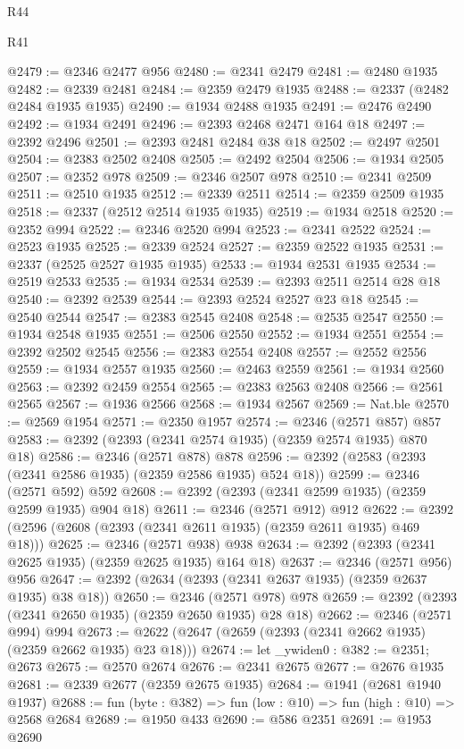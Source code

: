 \begin{lexlean}{R44}
\begin{lexlean}{R41}
\begin{coremodule}
{{{{{{{{{{{{{{{{{{{{{{{{{{{{{{{{{{{{{{{{{{{{{{{{{{{{{{{{{{{{{{{{{{{{{{{{{{{{{{{{{{{{{{{@2479 := @2346 @2477 @956
@2480 := @2341 @2479
@2481 := @2480 @1935
@2482 := @2339 @2481
@2484 := @2359 @2479 @1935
@2488 := @2337 (@2482 @2484 @1935 @1935)
@2490 := @1934 @2488 @1935
@2491 := @2476 @2490
@2492 := @1934 @2491
@2496 := @2393 @2468 @2471 @164 @18
@2497 := @2392 @2496
@2501 := @2393 @2481 @2484 @38 @18
@2502 := @2497 @2501
@2504 := @2383 @2502 @2408
@2505 := @2492 @2504
@2506 := @1934 @2505
@2507 := @2352 @978
@2509 := @2346 @2507 @978
@2510 := @2341 @2509
@2511 := @2510 @1935
@2512 := @2339 @2511
@2514 := @2359 @2509 @1935
@2518 := @2337 (@2512 @2514 @1935 @1935)
@2519 := @1934 @2518
@2520 := @2352 @994
@2522 := @2346 @2520 @994
@2523 := @2341 @2522
@2524 := @2523 @1935
@2525 := @2339 @2524
@2527 := @2359 @2522 @1935
@2531 := @2337 (@2525 @2527 @1935 @1935)
@2533 := @1934 @2531 @1935
@2534 := @2519 @2533
@2535 := @1934 @2534
@2539 := @2393 @2511 @2514 @28 @18
@2540 := @2392 @2539
@2544 := @2393 @2524 @2527 @23 @18
@2545 := @2540 @2544
@2547 := @2383 @2545 @2408
@2548 := @2535 @2547
@2550 := @1934 @2548 @1935
@2551 := @2506 @2550
@2552 := @1934 @2551
@2554 := @2392 @2502 @2545
@2556 := @2383 @2554 @2408
@2557 := @2552 @2556
@2559 := @1934 @2557 @1935
@2560 := @2463 @2559
@2561 := @1934 @2560
@2563 := @2392 @2459 @2554
@2565 := @2383 @2563 @2408
@2566 := @2561 @2565
@2567 := @1936 @2566
@2568 := @1934 @2567
@2569 := Nat.ble
@2570 := @2569 @1954
@2571 := @2350 @1957
@2574 := @2346 (@2571 @857) @857
@2583 := @2392 (@2393 (@2341 @2574 @1935) (@2359 @2574 @1935) @870 @18)
@2586 := @2346 (@2571 @878) @878
@2596 := @2392 (@2583 (@2393 (@2341 @2586 @1935) (@2359 @2586 @1935) @524 @18))
@2599 := @2346 (@2571 @592) @592
@2608 := @2392 (@2393 (@2341 @2599 @1935) (@2359 @2599 @1935) @904 @18)
@2611 := @2346 (@2571 @912) @912
@2622 := @2392 (@2596 (@2608 (@2393 (@2341 @2611 @1935) (@2359 @2611 @1935) @469 @18)))
@2625 := @2346 (@2571 @938) @938
@2634 := @2392 (@2393 (@2341 @2625 @1935) (@2359 @2625 @1935) @164 @18)
@2637 := @2346 (@2571 @956) @956
@2647 := @2392 (@2634 (@2393 (@2341 @2637 @1935) (@2359 @2637 @1935) @38 @18))
@2650 := @2346 (@2571 @978) @978
@2659 := @2392 (@2393 (@2341 @2650 @1935) (@2359 @2650 @1935) @28 @18)
@2662 := @2346 (@2571 @994) @994
@2673 := @2622 (@2647 (@2659 (@2393 (@2341 @2662 @1935) (@2359 @2662 @1935) @23 @18)))
@2674 := let _ywiden0 : @382 := @2351; @2673
@2675 := @2570 @2674
@2676 := @2341 @2675
@2677 := @2676 @1935
@2681 := @2339 @2677 (@2359 @2675 @1935)
@2684 := @1941 (@2681 @1940 @1937)
@2688 := fun (byte : @382) => fun (low : @10) => fun (high : @10) => @2568 @2684
@2689 := @1950 @433
@2690 := @586 @2351
@2691 := @1953 @2690
}}}}}}}}}}}}}}}}}}}}}}}}}}}}}}}}}}}}}}}}}}}}}}}}}}}}}}}}}}}}}}}}}}}}}}}}}}}}}}}}}}}}}}}
\end{coremodule}
\end{lexlean}
\end{lexlean}
